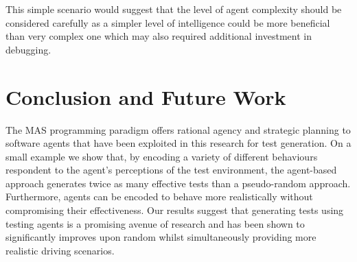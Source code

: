 \documentclass[letterpaper, 10 pt, journal, twoside]{IEEEtran}
\begin{document}
This simple scenario would suggest that the level of agent complexity should be considered carefully as a simpler level of intelligence could be more beneficial than very complex one which may also required additional investment in debugging.





\section{Conclusion and Future Work}\label{s:conclusion}
The MAS programming paradigm offers rational agency and strategic planning to software agents that have been exploited in this research for test generation. 
%
On a small example we show that, by encoding a variety of different behaviours respondent to the agent's perceptions of the test environment, the agent-based approach generates twice as many effective tests than a pseudo-random approach. Furthermore, agents can be encoded to behave more realistically without compromising their effectiveness. %
Our results suggest that generating tests using testing agents is a promising avenue of research and has been shown to significantly improves upon random whilst simultaneously providing more realistic driving scenarios.
\end{document}
